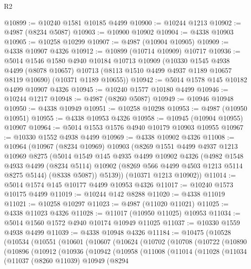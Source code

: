 \begin{lexlean}{R2}
\begin{coremodule}
@10899 := @10240 @1581 @10185 @4499
@10900 := @10244 @1213
@10902 := @4987 (@8234 @5087)
@10903 := @10900 @10902
@10904 := @4338 @10903
@10905 := @10258 @10299
@10907 := @4987 (@10904 @10905)
@10909 := @4338 @10907 @4326
@10912 := @10899 (@10714 @10909) @10717
@10936 := @5014
    @1546
    @1580
    @4940
    @10184
    @10713
    @10909
    (@10330
      @1545
      @4938
      @4499
      (@8078 @10657)
      @10713
      (@8113 @1510 @4499 @4937 @1189 @10657 @8119 @10690)
      (@10371 @1189 @10655))
@10942 := @5014 @1578 @145 @10182 @4499 @10907 @4326
@10945 := @10240 @1577 @10180 @4499
@10946 := @10244 @1217
@10948 := @4987 (@8260 @5087)
@10949 := @10946 @10948
@10950 := @4338 @10949
@10951 := @10258 @10298
@10953 := @4987 (@10950 @10951)
@10955 := @4338 @10953 @4326
@10958 := @10945 (@10904 @10955) @10907
@10964 := @5014 @1553 @1576 @4940 @10179 @10903 @10955
@10967 := @10330 @1552 @4938 @4499
@10969 := @4338 @10902 @4326
@11008 := @10964
    (@10967
      (@8234 @10969)
      @10903
      (@8269
        @1551
        @4499
        @4937
        @1213
        @10969
        @8275
        (@5014
          @1549
          @145
          @4935
          @4499
          @10902
          @4326
          (@4982
            @1548
            @4933
            @4499
            (@8234 @5114)
            @10902
            (@8269 @566 @4499 @4503 @1213 @5114 @8275 @5144)
            (@8338 @5087))
          @5139))
      (@10371 @1213 @10902))
@11014 := @5014 @1574 @145 @10177 @4499 @10953 @4326
@11017 := @10240 @1573 @10175 @4499
@11019 := @10244 @142 @8288
@11020 := @4338 @11019
@11021 := @10258 @10297
@11023 := @4987 (@11020 @11021)
@11025 := @4338 @11023 @4326
@11028 := @11017 (@10950 @11025) @10953
@11034 := @5014 @1560 @1572 @4940 @10174 @10949 @11025
@11037 := @10330 @1559 @4938 @4499
@11039 := @4338 @10948 @4326
@11184 := @10475
    (@10528
      (@10534
        (@10551
          (@10601
            (@10607
              (@10624
                (@10702
                  (@10708
                    (@10722
                      (@10890
                        (@10896
                          (@10912
                            (@10936
                              (@10942
                                (@10958
                                  (@11008
                                    (@11014
                                      (@11028
                                        (@11034
                                          (@11037
                                            (@8260 @11039)
                                            @10949
                                            (@8294

\end{coremodule}
\end{lexlean}
